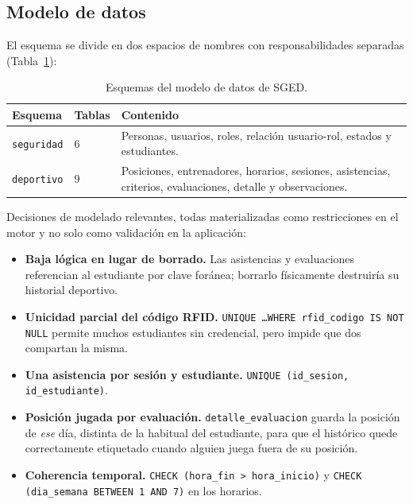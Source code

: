 \documentclass[11pt,a4paper]{article}
\begin{document}
\subsection{Modelo de datos}

El esquema se divide en dos espacios de nombres con responsabilidades
separadas (Tabla~\ref{tab:esquemas}):

\begin{table}[htbp]
\centering
\caption{Esquemas del modelo de datos de SGED.}
\label{tab:esquemas}
\begin{tabular}{@{}llp{7.4cm}@{}}
\toprule
\textbf{Esquema} & \textbf{Tablas} & \textbf{Contenido} \\
\midrule
\texttt{seguridad} & 6 & Personas, usuarios, roles, relación usuario-rol,
estados y estudiantes. \\
\texttt{deportivo} & 9 & Posiciones, entrenadores, horarios, sesiones,
asistencias, criterios, evaluaciones, detalle y observaciones. \\
\bottomrule
\end{tabular}
\end{table}

Decisiones de modelado relevantes, todas materializadas como restricciones
en el motor y no solo como validación en la aplicación:

\begin{itemize}[leftmargin=*]
  \item \textbf{Baja lógica en lugar de borrado.} Las asistencias y
    evaluaciones referencian al estudiante por clave foránea; borrarlo
    físicamente destruiría su historial deportivo.
  \item \textbf{Unicidad parcial del código RFID.}
    \texttt{UNIQUE \ldots WHERE rfid\_codigo IS NOT NULL} permite muchos
    estudiantes sin credencial, pero impide que dos compartan la misma.
  \item \textbf{Una asistencia por sesión y estudiante.}
    \texttt{UNIQUE (id\_sesion, id\_estudiante)}.
  \item \textbf{Posición jugada por evaluación.}
    \texttt{detalle\_evaluacion} guarda la posición de \emph{ese} día,
    distinta de la habitual del estudiante, para que el histórico quede
    correctamente etiquetado cuando alguien juega fuera de su posición.
  \item \textbf{Coherencia temporal.}
    \texttt{CHECK (hora\_fin > hora\_inicio)} y
    \texttt{CHECK (dia\_semana BETWEEN 1 AND 7)} en los horarios.
\end{itemize}
\end{document}
